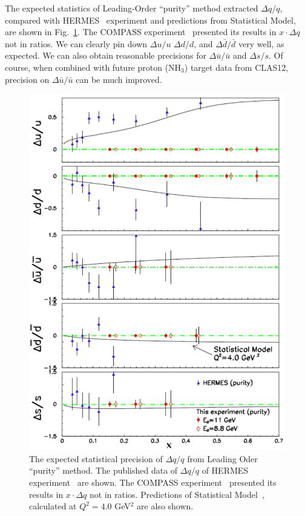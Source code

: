 The expected statistics of Leading-Order ``purity'' method extracted  $\Delta q/q$, compared with HERMES~\cite{Airapetian:2004zf}  experiment and predictions from Statistical Model,   are  shown in Fig.~\ref{fig:delta5q}.  The COMPASS experiment~\cite{Alekseev:2010ub}  presented its results in $x\cdot \Delta q$ not in ratios. We can clearly pin down $\Delta u/u$ $\Delta d/d$, and $\Delta \bar{d}/\bar{d}$ very well, as expected. We can also obtain reasonable precisions for $\Delta \bar{u}/\bar{u}$ and $\Delta s/s$. Of course, when combined with future proton (NH$_3$) target data from CLAS12,  precision on $\Delta \bar{u}/\bar{u}$ can be much improved.
\begin{figure}[htbp]
\centering
    \includegraphics[width=0.92\linewidth]{figs_xj/delta5q_purity_060114.pdf}
\caption{\label{fig:delta5q} The expected statistical precision of $\Delta q/q$ from Leading Oder ``purity'' method.  
The published data of $\Delta q/q$ of  HERMES experiment~\cite{Airapetian:2004zf} are shown.  The COMPASS experiment~\cite{Alekseev:2010ub}  presented its results in $x\cdot \Delta q$ not in ratios.
Predictions of Statistical Model~\cite{Bourrely200739}, calculated at $Q^2=4.0$ GeV$^2$  are also shown.
}
\end{figure}

